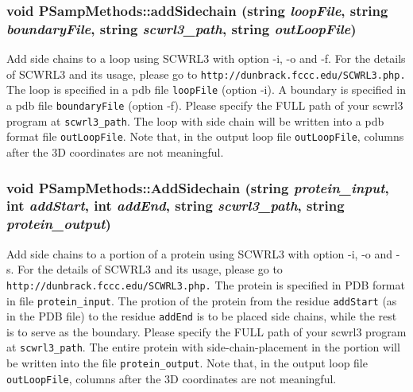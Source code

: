 \subsubsection{\setlength{\rightskip}{0pt plus 5cm}void PSamp\-Methods::add\-Sidechain (string {\em loop\-File}, string {\em boundary\-File}, string {\em scwrl3\_\-path}, string {\em out\-Loop\-File})\hspace{0.3cm}{\tt  [static]}}\label{classPSampMethods_09502e6560a9b691d8f4da1d7c89ddee}


Add side chains to a loop using SCWRL3 with option -i, -o and -f. For the details of SCWRL3 and its usage, please go to {\tt http://dunbrack.fccc.edu/SCWRL3.php.} The loop is specified in a pdb file {\tt loop\-File} (option -i). A boundary is specified in a pdb file {\tt boundary\-File} (option -f). Please specify the FULL path of your scwrl3 program at {\tt scwrl3\_\-path}. The loop with side chain will be written into a pdb format file {\tt out\-Loop\-File}. Note that, in the output loop file {\tt out\-Loop\-File}, columns after the 3D coordinates are not meaningful. 
\subsubsection{\setlength{\rightskip}{0pt plus 5cm}void PSamp\-Methods::Add\-Sidechain (string {\em protein\_\-input}, int {\em add\-Start}, int {\em add\-End}, string {\em scwrl3\_\-path}, string {\em protein\_\-output})\hspace{0.3cm}{\tt  [static]}}\label{classPSampMethods_ef56d22a8444cbcf1b0ff836ca6bd584}


Add side chains to a portion of a protein using SCWRL3 with option -i, -o and -s. For the details of SCWRL3 and its usage, please go to {\tt http://dunbrack.fccc.edu/SCWRL3.php.} The protein is specified in PDB format in file {\tt protein\_\-input}. The protion of the protein from the residue {\tt add\-Start} (as in the PDB file) to the residue {\tt add\-End} is to be placed side chains, while the rest is to serve as the boundary. Please specify the FULL path of your scwrl3 program at {\tt scwrl3\_\-path}. The entire protein with side-chain-placement in the portion will be written into the file {\tt protein\_\-output}. Note that, in the output loop file {\tt out\-Loop\-File}, columns after the 3D coordinates are not meaningful. 
